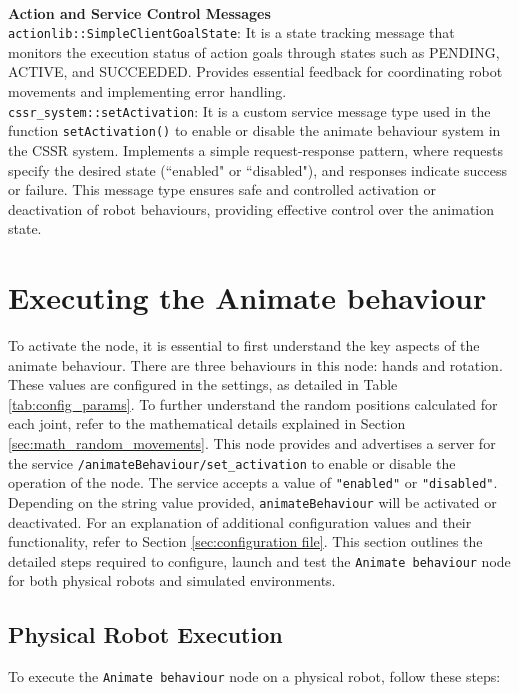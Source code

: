 \documentclass{CSSRforAfrica}
\begin{document}
\\[1em]
\textbf{Action and Service Control Messages}\\
\texttt{actionlib::SimpleClientGoalState}:  
It is a state tracking message that monitors the execution status of action goals through states such as PENDING, ACTIVE, and SUCCEEDED. Provides essential feedback for coordinating robot movements and implementing error handling.
\\[1em]
\texttt{cssr\_system::setActivation}:  
It is a custom service message type used in the function \texttt{setActivation()} to enable or disable the animate behaviour system in the CSSR system. Implements a simple request-response pattern, where requests specify the desired state (``enabled" or ``disabled"), and responses indicate success or failure. This message type ensures safe and controlled activation or deactivation of robot behaviours, providing effective control over the animation state.

\newpage
\section{Executing the Animate behaviour}
To activate the node, it is essential to first understand the key aspects of the animate behaviour. There are three behaviours in this node: hands and rotation. These values are configured in the settings, as detailed in Table \ref{tab:config_params}. To further understand the random positions calculated for each joint, refer to the mathematical details explained in Section \ref{sec:math_random_movements}. This node provides and advertises a server for the service \texttt{/animateBehaviour/set\_activation}
 to enable or disable the operation of the node. The service accepts a value of \texttt{"enabled"} or \texttt{"disabled"}. Depending on the string value provided, \texttt{animateBehaviour} will be activated or deactivated. For an explanation of additional configuration values and their functionality, refer to Section \ref{sec:configuration file}. This section outlines the detailed steps required to configure, launch and test the \texttt{Animate behaviour} node for both physical robots and simulated environments.

\subsection{Physical Robot Execution}
To execute the \texttt{Animate behaviour} node on a physical robot, follow these steps:
\end{document}
